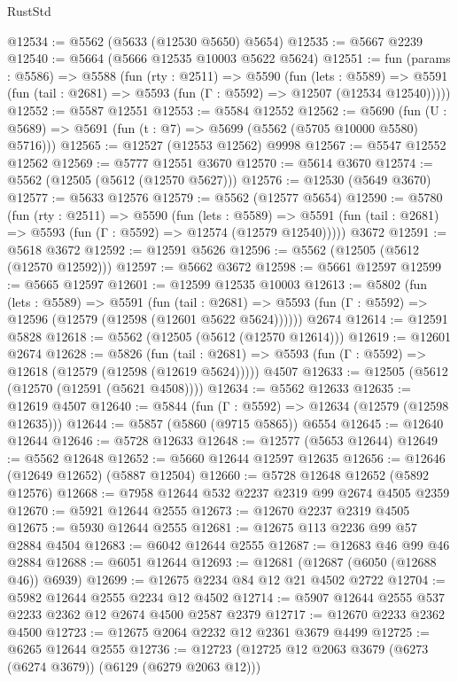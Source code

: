 \begin{lexlean}{RustStd}
\begin{coremodule}
@12534 := @5562 (@5633 (@12530 @5650) @5654)
@12535 := @5667 @2239
@12540 := @5664 (@5666 @12535 @10003 @5622 @5624)
@12551 := fun (params : @5586) =>
  @5588
    (fun (rty : @2511) =>
    @5590
      (fun (lets : @5589) =>
      @5591 (fun (tail : @2681) => @5593 (fun (Γ : @5592) => @12507 (@12534 @12540)))))
@12552 := @5587 @12551
@12553 := @5584 @12552
@12562 := @5690
    (fun (U : @5689) => @5691 (fun (t : @7) => @5699 (@5562 (@5705 @10000 @5580) @5716)))
@12565 := @12527 (@12553 @12562) @9998
@12567 := @5547 @12552 @12562
@12569 := @5777 @12551 @3670
@12570 := @5614 @3670
@12574 := @5562 (@12505 (@5612 (@12570 @5627)))
@12576 := @12530 (@5649 @3670)
@12577 := @5633 @12576
@12579 := @5562 (@12577 @5654)
@12590 := @5780
    (fun (rty : @2511) =>
    @5590
      (fun (lets : @5589) =>
      @5591 (fun (tail : @2681) => @5593 (fun (Γ : @5592) => @12574 (@12579 @12540)))))
    @3672
@12591 := @5618 @3672
@12592 := @12591 @5626
@12596 := @5562 (@12505 (@5612 (@12570 @12592)))
@12597 := @5662 @3672
@12598 := @5661 @12597
@12599 := @5665 @12597
@12601 := @12599 @12535 @10003
@12613 := @5802
    (fun (lets : @5589) =>
    @5591
      (fun (tail : @2681) =>
      @5593 (fun (Γ : @5592) => @12596 (@12579 (@12598 (@12601 @5622 @5624))))))
    @2674
@12614 := @12591 @5828
@12618 := @5562 (@12505 (@5612 (@12570 @12614)))
@12619 := @12601 @2674
@12628 := @5826
    (fun (tail : @2681) => @5593 (fun (Γ : @5592) => @12618 (@12579 (@12598 (@12619 @5624)))))
    @4507
@12633 := @12505 (@5612 (@12570 (@12591 (@5621 @4508))))
@12634 := @5562 @12633
@12635 := @12619 @4507
@12640 := @5844 (fun (Γ : @5592) => @12634 (@12579 (@12598 @12635)))
@12644 := @5857 (@5860 (@9715 @5865)) @6554
@12645 := @12640 @12644
@12646 := @5728 @12633
@12648 := @12577 (@5653 @12644)
@12649 := @5562 @12648
@12652 := @5660 @12644 @12597 @12635
@12656 := @12646 (@12649 @12652) (@5887 @12504)
@12660 := @5728 @12648 @12652 (@5892 @12576)
@12668 := @7958 @12644 @532 @2237 @2319 @99 @2674 @4505 @2359
@12670 := @5921 @12644 @2555
@12673 := @12670 @2237 @2319 @4505
@12675 := @5930 @12644 @2555
@12681 := @12675 @113 @2236 @99 @57 @2884 @4504
@12683 := @6042 @12644 @2555
@12687 := @12683 @46 @99 @46 @2884
@12688 := @6051 @12644
@12693 := @12681 (@12687 (@6050 (@12688 @46)) @6939)
@12699 := @12675 @2234 @84 @12 @21 @4502 @2722
@12704 := @5982 @12644 @2555 @2234 @12 @4502
@12714 := @5907 @12644 @2555 @537 @2233 @2362 @12 @2674 @4500 @2587 @2379
@12717 := @12670 @2233 @2362 @4500
@12723 := @12675 @2064 @2232 @12 @2361 @3679 @4499
@12725 := @6265 @12644 @2555
@12736 := @12723 (@12725 @12 @2063 @3679 (@6273 (@6274 @3679)) (@6129 (@6279 @2063 @12)))

\end{coremodule}
\end{lexlean}
